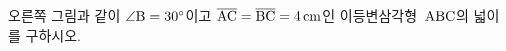 \noindent\begin{minipage}[t]{0.58\linewidth}\vspace{0pt}\raggedright 오른쪽 그림과 같이 $\angle\mathrm{B}=30^\circ$이고 $\overline{\mathrm{AC}}=\overline{\mathrm{BC}}=4\,\mathrm{cm}$인 이등변삼각형~$\mathrm{ABC}$의 넓이를 구하시오.\end{minipage}\hfill\begin{minipage}[t]{0.4\linewidth}\vspace{0pt}\centering \resizebox{\ifdim\width>\linewidth\linewidth\else\width\fi}{!}{}\end{minipage}\par
